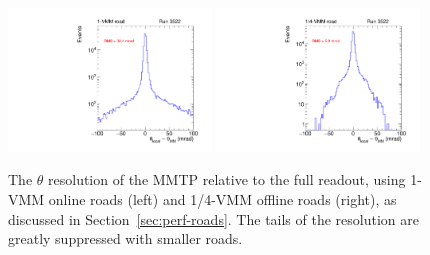 \begin{figure}[!htpb]
  \begin{center}
    \includegraphics[width=0.48\textwidth]{figures/gbtanalysis3522/TP_angres_full.pdf}
    \includegraphics[width=0.48\textwidth]{figures/gbtanalysis3522/TP_angres.pdf}
  \end{center}
  \vspace{-10pt}
  \caption{The $\theta$ resolution of the MMTP relative to the full readout, using 1-VMM online roads (left) and 1/4-VMM offline roads (right), as discussed in Section~\ref{sec:perf-roads}. The tails of the resolution are greatly suppressed with smaller roads.}
  \label{fig:thetares}
\end{figure}

